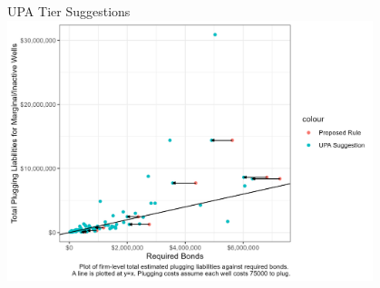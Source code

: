 \documentclass{beamer}
\begin{document}
\begin{frame}{UPA Tier Suggestions}
\label{UPA}
\includegraphics[width=0.8\textwidth]{Figures/UPA_Suggestion_Bond_Changes.jpg}\\
\hyperlink{Thanks}{}
\end{frame}
\end{document}
